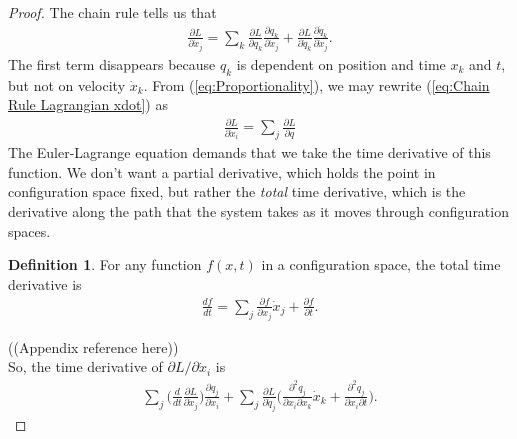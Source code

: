 \documentclass[10.5pt, psamsfonts]{amsart}
\theoremstyle{definition}
\newtheorem{defn}[thm]{Definition}
\theoremstyle{remark}
\numberwithin{equation}{section}
\begin{document}
\begin{proof}
The chain rule tells us that
\begin{align}
  \label{eq:Chain Rule Lagrangian xdot} 
  \frac{\partial L}{\partial \dot{x}_j}  = \sum_k \frac{\partial L}{\partial q_k} \frac{\partial q_k}{\partial \dot{x}_j} + \frac{\partial L}{\partial \dot{q}_k} \frac{\partial \dot{q}_k}{\partial \dot{x}_j}.
\end{align}
The first term disappears because $q_k$ is dependent on position and time $x_k$ and $t$, but not on velocity $\dot{x}_k$. From (\ref{eq:Proportionality}), we may rewrite (\ref{eq:Chain Rule Lagrangian xdot}) as
\begin{align*}
  \frac{\partial L}{\partial \dot{x}_i} = \sum_j \frac{\partial L}{\partial q} 
\end{align*}
The Euler-Lagrange equation demands that we take the time derivative of this function. We don't want a partial derivative, which holds the point in configuration space fixed, but rather the \textit{total} time derivative, which is the derivative along the path that the system takes as it moves through configuration spaces.

\begin{defn}
For any function $f(x,t)$ in a configuration space, the total time derivative is
\begin{align*}
  \frac{df}{dt} = \sum_j \frac{\partial f}{\partial x_j} \dot{x}_j + \frac{\partial f}{\partial t}. 
\end{align*}
\end{defn}
((Appendix reference here))\\
\noindent So, the time derivative of $\partial L/\partial \dot{x}_i$ is
\begin{align}
  \label{eq:Time Derivative Lagrangian}
  \sum_j \bigg(\frac{d}{dt} \frac{\partial L}{\partial \dot{x}_j}  \bigg) \frac{\partial q_j}{\partial x_i} + \sum_j \frac{\partial L}{\partial \dot{q}_j} \bigg(\frac{\partial^2 q_j}{\partial x_i \partial x_k} \dot{x}_k + \frac{\partial^2 q_j}{\partial x_i \partial t}  \bigg).
\end{align}


\end{proof}
\end{document}
